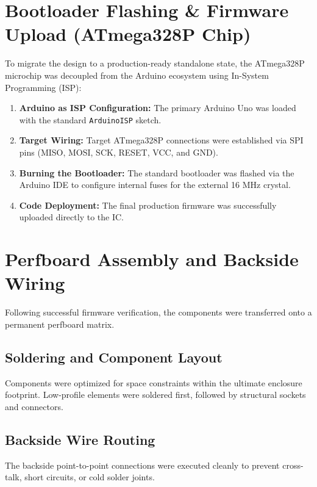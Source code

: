 \documentclass[11pt,a4paper]{article}
\begin{document}
\section{Bootloader Flashing \& Firmware Upload (ATmega328P Chip)}
To migrate the design to a production-ready standalone state, the ATmega328P microchip was decoupled from the Arduino ecosystem using In-System Programming (ISP):
\begin{enumerate}
    \item \textbf{Arduino as ISP Configuration:} The primary Arduino Uno was loaded with the standard \texttt{ArduinoISP} sketch.
    \item \textbf{Target Wiring:} Target ATmega328P connections were established via SPI pins (MISO, MOSI, SCK, RESET, VCC, and GND).
    \item \textbf{Burning the Bootloader:} The standard bootloader was flashed via the Arduino IDE to configure internal fuses for the external 16 MHz crystal.
    \item \textbf{Code Deployment:} The final production firmware was successfully uploaded directly to the IC.
\end{enumerate}

\section{Perfboard Assembly and Backside Wiring}
Following successful firmware verification, the components were transferred onto a permanent perfboard matrix.

\subsection{Soldering and Component Layout}
Components were optimized for space constraints within the ultimate enclosure footprint. Low-profile elements were soldered first, followed by structural sockets and connectors.

\subsection{Backside Wire Routing}
The backside point-to-point connections were executed cleanly to prevent cross-talk, short circuits, or cold solder joints.
\end{document}
